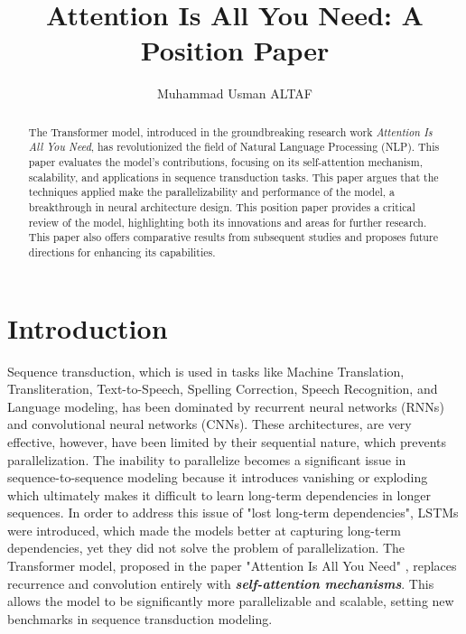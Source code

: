 \documentclass[runningheads]{llncs}
\begin{document}
\title{Attention Is All You Need: A Position Paper}

\author{Muhammad Usman ALTAF}
%
%
%
\maketitle              
%
\begin{abstract}
The Transformer model, introduced in the groundbreaking research work \textit{Attention Is All You Need}, has revolutionized the field of Natural Language Processing (NLP). This paper evaluates the model’s contributions, focusing on its self-attention mechanism, scalability, and applications in sequence transduction tasks. This paper argues that the techniques applied make the parallelizability and performance of the model, a breakthrough in neural architecture design. This position paper provides a critical review of the model, highlighting both its innovations and areas for further research. This paper also offers comparative results from subsequent studies and proposes future directions for enhancing its capabilities.

\end{abstract}
%
%
%
\section{Introduction}
Sequence transduction, which is used in tasks like Machine Translation, Transliteration, Text-to-Speech, Spelling Correction, Speech Recognition, and Language modeling, has been dominated by recurrent neural networks (RNNs) and convolutional neural networks (CNNs). These architectures, are very effective, however, have been limited by their sequential nature, which prevents parallelization.
The inability to parallelize becomes a significant issue in sequence-to-sequence modeling because it introduces vanishing or exploding which ultimately makes it difficult to learn long-term dependencies in longer sequences.
In order to address this issue of "lost long-term dependencies", LSTMs were introduced, which made the models better at capturing long-term dependencies, yet they did not solve the problem of parallelization.
The Transformer model, proposed in the paper "Attention Is All You Need" \cite{vaswani2017attention}, replaces recurrence and convolution entirely with \textit{\textbf{self-attention mechanisms}}. This allows the model to be significantly more parallelizable and scalable, setting new benchmarks in sequence transduction modeling.
\end{document}
